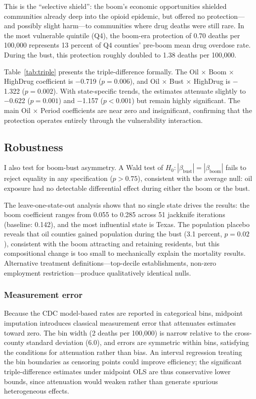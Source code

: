 \documentclass[12pt]{article}
\begin{document}


This is the ``selective shield'': the boom's economic opportunities shielded communities already deep into the opioid epidemic, but offered no protection---and possibly slight harm---to communities where drug deaths were still rare. In the most vulnerable quintile (Q4), the boom-era protection of 0.70 deaths per 100,000 represents 13 percent of Q4 counties' pre-boom mean drug overdose rate. During the bust, this protection roughly doubled to 1.38 deaths per 100,000.

Table~\ref{tab:triple} presents the triple-difference formally. The Oil $\times$ Boom $\times$ HighDrug coefficient is $-$0.719 ($p = 0.006$), and Oil $\times$ Bust $\times$ HighDrug is $-$1.322 ($p = 0.002$). With state-specific trends, the estimates attenuate slightly to $-$0.622 ($p = 0.001$) and $-$1.157 ($p < 0.001$) but remain highly significant. The main Oil $\times$ Period coefficients are near zero and insignificant, confirming that the protection operates entirely through the vulnerability interaction.



\subsection{Robustness}

I also test for boom-bust asymmetry. A Wald test of $H_0: |\beta_{\text{bust}}| = |\beta_{\text{boom}}|$ fails to reject equality in any specification ($p > 0.75$), consistent with the average null: oil exposure had no detectable differential effect during either the boom or the bust.

The leave-one-state-out analysis shows that no single state drives the results: the boom coefficient ranges from 0.055 to 0.285 across 51 jackknife iterations (baseline: 0.142), and the most influential state is Texas. The population placebo reveals that oil counties gained population during the bust (3.1 percent, $p = 0.02$), consistent with the boom attracting and retaining residents, but this compositional change is too small to mechanically explain the mortality results. Alternative treatment definitions---top-decile establishments, non-zero employment restriction---produce qualitatively identical nulls.

\subsubsection*{Measurement error} Because the CDC model-based rates are reported in categorical bins, midpoint imputation introduces classical measurement error that attenuates estimates toward zero. The bin width (2 deaths per 100,000) is narrow relative to the cross-county standard deviation (6.0), and errors are symmetric within bins, satisfying the conditions for attenuation rather than bias. An interval regression treating the bin boundaries as censoring points could improve efficiency; the significant triple-difference estimates under midpoint OLS are thus conservative lower bounds, since attenuation would weaken rather than generate spurious heterogeneous effects.
\end{document}
